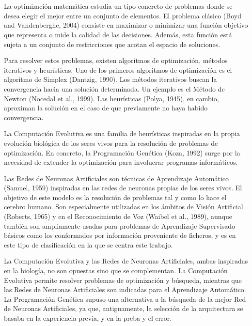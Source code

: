 \documentclass[spanish,a4paper,12pt,twoside]{report}
\begin{document}
  \chapter{\vspace{-3cm}{\LARGE 1. Introducción}}
  \vspace{-1cm}
  La optimización matemática estudia un tipo concreto de problemas donde se desea elegir el mejor entre un conjunto de elementos. El problema clásico (Boyd and Vandenberghe, 2004) consiste en maximizar o minimizar una función objetivo que representa o mide la calidad de las decisiones. Además, esta función está sujeta a un conjunto de restricciones que acotan el espacio de soluciones. \par
  Para resolver estos problemas, existen algoritmos de optimización, métodos iterativos y heurísticas. Uno de los primeros algoritmos de optimización es el algoritmo de Simplex (Dantzig, 1990). Los métodos iterativos buscan la convergencia hacia una solución determinada. Un ejemplo es el Método de Newton (Nocedal et al., 1999). Las heurísticas (Polya, 1945), en cambio, aproximan la solución en el caso de que previamente no haya habido convergencia. \par
  La Computación Evolutiva es una familia de heurísticas inspiradas en la propia evolución biológica de los seres vivos para la resolución de problemas de optimización. En concreto, la Programación Genética (Koza, 1992) surge por la necesidad de extender la optimización para involucrar programas informáticos. \par
  Las Redes de Neuronas Artificiales son técnicas de Aprendizaje Automático (Samuel, 1959) inspiradas en las redes de neuronas propias de los seres vivos. El objetivo de este modelo es la resolución de problemas tal y como lo hace el cerebro humano. Son especialmente utilizadas en los ámbitos de Visión Artificial (Roberts, 1965) y en el Reconocimiento de Voz (Waibel et al., 1989), aunque también son ampliamente usadas para problemas de Aprendizaje Supervisado básicos como los conformados por información proveniente de ficheros, y es en este tipo de clasificación en la que se centra este trabajo. \par
  La Computación Evolutiva y las Redes de Neuronas Artificiales, ambas inspiradas en la biología, no son opuestas sino que se complementan. La Computación Evolutiva permite resolver problemas de optimización y búsqueda, mientras que las Redes de Neuronas Artificiales son indicadas para el Aprendizaje Automático. La Programación Genética supuso una alternativa a la búsqueda de la mejor Red de Neuronas Artificiales, ya que, antiguamente, la selección de la arquitectura se basaba en la experiencia previa, y en la preba y el error. \par
\end{document}
